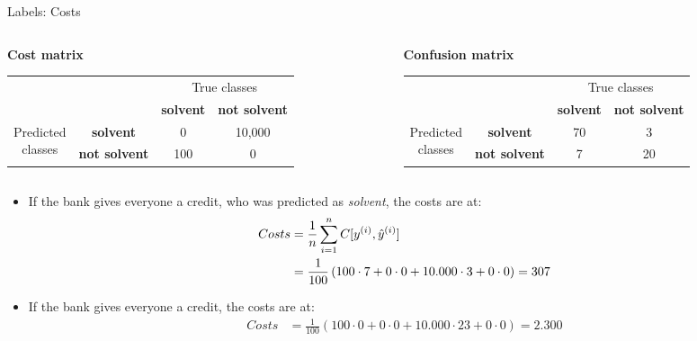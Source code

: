 \begin{vbframe}{Labels: Costs}

\begin{columns}
\begin{column}{0.5\textwidth} 
\footnotesize\textbf{Cost matrix}
 \begin{table}[ht]
 \tiny
\begin{center}
\begin{tabular}{cccc}
    \hline
    & &\multicolumn{2}{c}{True classes} \\ 
    & &\textbf{solvent} & \textbf{not solvent}  \\ 
 \hline
    \multirow{2}{*}{\parbox{0.5cm}{Predicted \\ classes}}& \textbf{solvent}     & 0                 & 10,000\\
    & \textbf{not solvent} & 100               & 0\\
    \hline
\end{tabular}
\end{center}
\end{table}
\end{column}

\begin{column}{0.5\textwidth}
\footnotesize\textbf{Confusion matrix}
 \begin{table}[ht]
 \tiny
\begin{center}
\begin{tabular}{cccc}
    \hline
    & &\multicolumn{2}{c}{True classes} \\ 
    & &\textbf{solvent} & \textbf{not solvent}  \\ 
 \hline
    \multirow{2}{*}{\parbox{0.5cm}{Predicted \\ classes}}& \textbf{solvent}     & 70                 & 3\\
    & \textbf{not solvent} & 7              & 20\\
    \hline
\end{tabular}
\end{center}
\end{table}
\end{column}
\end{columns}


  \begin{itemize}
      \item If the bank gives everyone a credit, who was predicted as \textit{solvent}, the costs are at:
      \begin{align*}
      Costs &= \frac{1}{n} \sum\limits_{i=1}^n C[y^{(i)}, \hat{y}^{(i)}] \\&= 
      \frac{1}{100} \left( 
      100 \cdot 7 + 
      0 \cdot 0 + 
      10.000 \cdot 3 +
      0 \cdot 0 
      \right) = 307
      \end{align*}
    \item If the bank gives everyone a credit, the costs are at:
      \begin{align*}
      Costs &= 
      \frac{1}{100} \left( 
      100 \cdot 0 + 
      0 \cdot 0 + 
      10.000 \cdot 23 +
      0 \cdot 0 
      \right) = 2.300
      \end{align*}
    

\end{itemize}
\end{vbframe}
